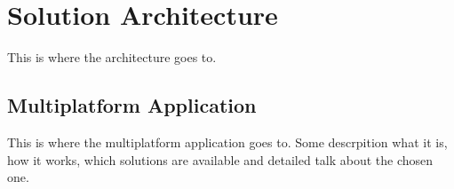 %
%
\chapter{Solution Architecture}\label{chap:architecture}

This is where the architecture goes to.

\section{Multiplatform Application}\label{sec:multiplatform-application}

This is where the multiplatform application goes to. Some descrpition what it is, how it works,
which solutions are available and detailed talk about the chosen one.